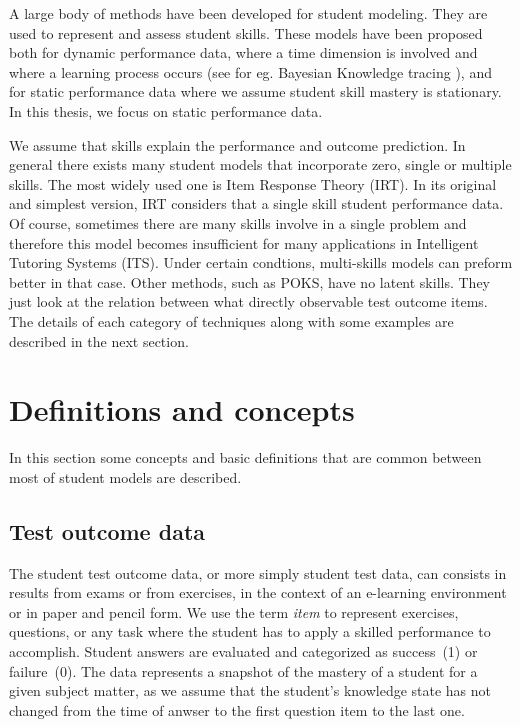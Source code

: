 \label{sec:RevLitt}

A large body of methods have been developed for student modeling.  They are used to represent and assess student skills. These models have been proposed both for dynamic performance data, where a time dimension is involved and where a learning process occurs (see for eg. Bayesian Knowledge tracing \citet{Koedinger2011}), and for static performance data where we assume student skill mastery is stationary.  In this thesis, we focus on static performance data.

We assume that skills explain the performance and outcome prediction. In general there exists many student models that incorporate zero, single or multiple skills. The most widely used one is Item Response Theory (IRT).  In its original and simplest version, IRT considers that a single skill student performance data. Of course, sometimes there are many skills involve in a single problem and therefore this model becomes insufficient for many applications in Intelligent Tutoring Systems (ITS). Under certain condtions, multi-skills models can preform better in that case. Other methods, such as POKS, have no latent skills. They just look at the relation between what directly observable test outcome items. The details of each category of techniques along with some examples are described in the next section.

\section{Definitions and concepts}

In this section some concepts and basic definitions that are common between most of student models are described. 
 
\subsection{Test outcome data}

The student test outcome data, or more simply student test data, can consists in results from exams or from exercises, in the context of an e-learning environment or in paper and pencil form.  We use the term \textit{item} to represent exercises, questions, or any task where the student has to apply a skilled performance to accomplish.  Student answers are evaluated and categorized as success~(1) or failure~(0).  The data represents a snapshot of the mastery of a student for a given subject matter, as we assume that the student's knowledge state has not changed from the time of anwser to the first question item to the last one.

